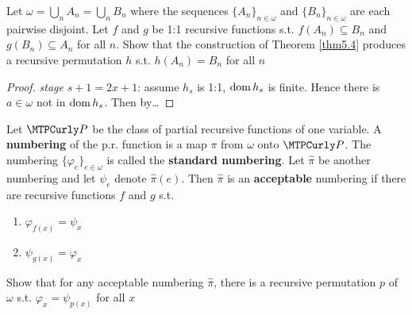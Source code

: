\documentclass[11pt]{article}
\begin{document}
\begin{exercise}
\label{ex1.5.8}
Let \(\omega=\bigcup_nA_n=\bigcup_nB_n\) where the sequences
\(\{A_n\}_{n\in\omega}\) and \(\{B_n\}_{n\in\omega}\) are each pairwise disjoint.
Let \(f\) and \(g\) be 1:1 recursive functions s.t. \(f(A_n)\subseteq B_n\) and
\(g(B_n)\subseteq A_n\) for all \(n\). Show that the construction of Theorem
\ref{thm5.4} produces a recursive permutation \(h\) s.t. \(h(A_n)=B_n\) for all \(n\)
\end{exercise}

\begin{proof}
\emph{stage} \(s+1=2x+1\): assume \(h_s\) is 1:1, \(\operatorname{dom} h_s\) is finite. Hence
there is \(a\in\omega\) not in \(\operatorname{dom} h_s\). Then by\ldots{}
\end{proof}

\begin{exercise}[Rogers]
\label{ex1.5.9}
Let \(\calp\) be the class of partial recursive functions of one variable. A
\textbf{numbering} of the p.r. function is a map \(\pi\) from \(\omega\) onto \(\calp\). The
numbering \(\{\varphi_e\}_{e\in\omega}\) is called the \textbf{standard numbering}.
Let \(\hat{\pi}\) be another numbering and let \(\psi_e\) denote
\(\hat{\pi}(e)\). Then \(\hat{\pi}\) is an \textbf{acceptable} numbering if there
are recursive functions \(f\) and \(g\) s.t.
\begin{enumerate}
\item \(\varphi_{f(x)}=\psi_x\)
\item \(\psi_{g(x)}=\varphi_x\)
\end{enumerate}


Show that for any acceptable numbering \(\hat{\pi}\), there is a recursive
permutation \(p\) of \(\omega\) s.t. \(\varphi_x=\psi_{p(x)}\) for all \(x\)
\end{exercise}
\end{document}
